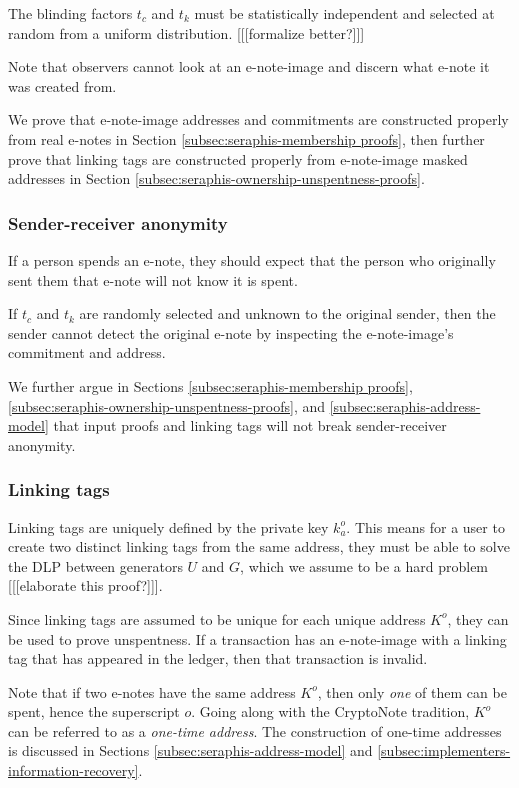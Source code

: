The blinding factors $t_c$ and $t_k$ must be statistically independent and selected at random from a uniform distribution. [[[formalize better?]]]

Note that observers cannot look at an e-note-image and discern what e-note it was created from.

We prove that e-note-image addresses and commitments are constructed properly from real e-notes in Section \ref{subsec:seraphis-membership proofs}, then further prove that linking tags are constructed properly from e-note-image masked addresses in Section \ref{subsec:seraphis-ownership-unspentness-proofs}.

\subsubsection{Sender-receiver anonymity}
\label{subsubsec:e-note-images-sender-receiver-anonymity}

If a person spends an e-note, they should expect that the person who originally sent them that e-note will not know it is spent.

If $t_c$ and $t_k$ are randomly selected and unknown to the original sender, then the sender cannot detect the original e-note by inspecting the e-note-image's commitment and address.

We further argue in Sections \ref{subsec:seraphis-membership proofs}, \ref{subsec:seraphis-ownership-unspentness-proofs}, and \ref{subsec:seraphis-address-model} that input proofs and linking tags will not break sender-receiver anonymity.

\subsubsection{Linking tags}
\label{subsubsec:e-note-images-linking-tags}

Linking tags are uniquely defined by the private key $k^o_a$. This means for a user to create two distinct linking tags from the same address, they must be able to solve the DLP between generators $U$ and $G$, which we assume to be a hard problem [[[elaborate this proof?]]].

Since linking tags are assumed to be unique for each unique address $K^o$, they can be used to prove unspentness. If a transaction has an e-note-image with a linking tag that has appeared in the ledger, then that transaction is invalid.

Note that if two e-notes have the same address $K^o$, then only {\em one} of them can be spent, hence the superscript $o$. Going along with the CryptoNote tradition, $K^o$ can be referred to as a {\em one-time address}. The construction of one-time addresses is discussed in Sections \ref{subsec:seraphis-address-model} and \ref{subsec:implementers-information-recovery}.


